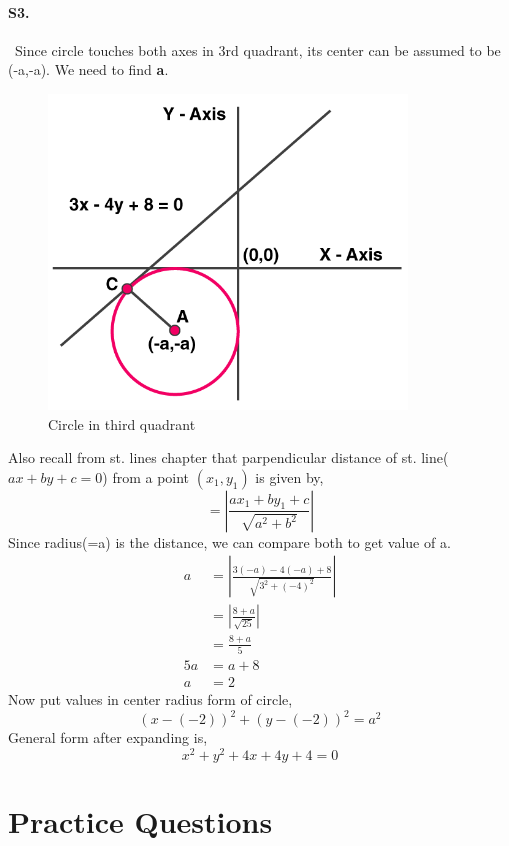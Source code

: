 \documentclass{article}
\begin{document}
\paragraph{S3.}\
Since circle touches both axes in 3rd quadrant, its center can be assumed to be (-a,-a).  We need to find \textbf{a}.
\begin{figure}[H]
    \centering
    \includegraphics[scale=0.5]{l4_ps1-3.png}
    \caption{Circle in third quadrant}
\end{figure}
Also recall from st. lines chapter that parpendicular distance of st. line($ax+by+c=0$) from a point $(x_1,y_1)$ is given by,
\begin{equation*}
    =\left|\frac{ax_1+by_1+c}{\sqrt{a^2+b^2}}\right|
\end{equation*} 
Since radius(=a) is the distance, we can compare both to get value of a.
\begin{align*}
    a&=\left|\frac{3(-a)-4(-a)+8}{\sqrt{3^2+(-4)^2}}\right|\\
    &=\left|\frac{8+a}{\sqrt{25}}\right|\\
    &=\frac{8+a}{5}\\
    5a&=a+8\\
    a&=2
\end{align*}
Now put values in center radius form of circle,
\begin{equation*}
    (x-(-2))^2+(y-(-2))^2=a^2
\end{equation*}
General form after expanding is,
\begin{equation*}
    x^2+y^2+4x+4y+4=0
\end{equation*}
\clearpage
\section*{Practice Questions}
\end{document}
